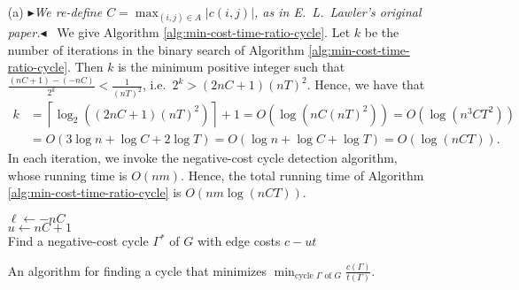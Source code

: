 \documentclass[letterpaper,reqno,12pt]{article}
\newcommand{\mynote}[3][red]
  {{\color{#1} \fbox{\bfseries\sffamily\scriptsize#2}
  {\small$\blacktriangleright$\textsf{\emph{#3}}$\blacktriangleleft$}}~}
\newcommand{\yp}[1]{\mynote{YP}{#1}}
\begin{document}
\begin{exercise}
  \begin{enumerate}
    \item[(a)] \yp{We re-define $C = \max_{(i, j) \in A} |c(i, j)|$, as in E.\ L.\ Lawler's original paper.}
    We give Algorithm \ref{alg:min-cost-time-ratio-cycle}. Let $k$ be the number of iterations in the binary search of Algorithm \ref{alg:min-cost-time-ratio-cycle}. Then $k$ is the minimum positive integer such that $\frac{(nC + 1) - (-nC)}{2^k} < \frac{1}{(nT)^2}$, i.e.\ $2^k > (2nC + 1)(nT)^2$. Hence, we have that
    \begin{align*}
      k &= \left\lceil \log_2 \left((2nC + 1)(nT)^2\right) \right\rceil + 1 = O\left(\log \left(nC (nT)^2\right)\right) = O\left(\log \left(n^3 CT^2\right)\right) \\
      &= O(3\log n + \log C + 2\log T) = O(\log n + \log C + \log T) = O(\log (nCT)).
    \end{align*}
    In each iteration, we invoke the negative-cost cycle detection algorithm, whose running time is $O(nm)$. Hence, the total running time of Algorithm \ref{alg:min-cost-time-ratio-cycle} is $O(nm\log(nCT))$.

    \begin{algorithm}
      $\ell \leftarrow -nC$ \\
      $u \leftarrow nC + 1$ \\
      Find a negative-cost cycle $\Gamma^*$ of $G$ with edge costs $c - ut$ \\
      \Return{$\Gamma^*$}
      \caption{An algorithm for finding a cycle that minimizes $\min_\text{cycle $\Gamma$ of $G$} \frac{c(\Gamma)}{t(\Gamma)}$.}
      \label{alg:min-cost-time-ratio-cycle}
    \end{algorithm}


\end{enumerate}
\end{exercise}
\end{document}
